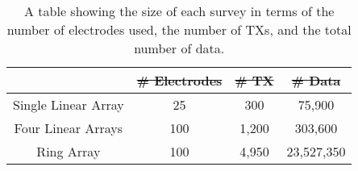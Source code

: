 \documentclass[preprint,authoryear,12pt]{elsarticle}
\providecommand{\DIFaddtex}[1]{{\protect\color{blue}\uwave{#1}}} %
\providecommand{\DIFdeltex}[1]{{\protect\color{red}\sout{#1}}}                      %
\providecommand{\DIFaddFL}[1]{\DIFadd{#1}} %
\providecommand{\DIFdelFL}[1]{\DIFdel{#1}} %
\providecommand{\DIFaddbeginFL}{} %
\providecommand{\DIFaddendFL}{} %
\providecommand{\DIFdelbeginFL}{} %
\providecommand{\DIFdelendFL}{} %
\providecommand{\DIFadd}[1]{\texorpdfstring{\DIFaddtex{#1}}{#1}} %
\providecommand{\DIFdel}[1]{\texorpdfstring{\DIFdeltex{#1}}{}} %
\begin{document}
\begin{table} [htp]
   \footnotesize
    \begin{center}
        \begin{tabular}{| c | c | c | c |}
            \hline
             & \DIFdelbeginFL \DIFdelFL{\# Electrodes }\DIFdelendFL \DIFaddbeginFL \textbf{\DIFaddFL{\mbox{\boldmath$\#$} Electrodes}} \DIFaddendFL & \DIFdelbeginFL \DIFdelFL{\# TX }\DIFdelendFL \DIFaddbeginFL \textbf{\DIFaddFL{\mbox{\boldmath$\#$} TX}} \DIFaddendFL & \DIFdelbeginFL \DIFdelFL{\# Data}\DIFdelendFL \DIFaddbeginFL \textbf{\DIFaddFL{\mbox{\boldmath$\#$} Data}}\DIFaddendFL \\
            \hline
            Single Linear Array & 25 & 300 & 75,900 \\
            \hline
            Four Linear Arrays & 100 & 1,200 & 303,600 \\
            \hline
            Ring Array & 100 & 4,950 & 23,527,350 \\
            \hline
        \end{tabular}
    \end{center}
\caption{A table showing the size of each survey in terms of the number of electrodes used, the number of TXs, and the total number of data.}
\label{table:SurveyDesign_Horseshoe_FullSurveyStats}
\end{table}
\end{document}
